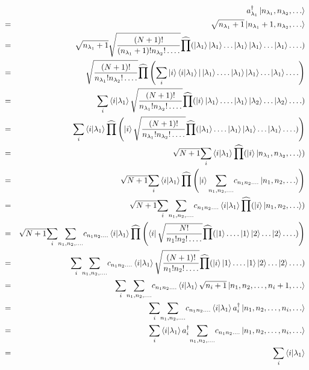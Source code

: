 \documentclass{article}
\begin{document}
\begin{eqnarray*}  
&  & a_{\lambda_1}^{\dag}  \ket{n_{\lambda_1}, n_{\lambda_2}, \ldots} \\ & = & \sqrt{n_{\lambda_1} + 1} \ket{n_{\lambda_1} + 1,  n_{\lambda_2}, \ldots}\\  & = & \sqrt{n_{\lambda_1} + 1} \sqrt{\frac{(N + 1) !}{(n_{\lambda_1} + 1)  !n_{\lambda_2} ! \ldots .}} \widehat{\prod} (\ket{\lambda_1}    \ket{\lambda_1} \ldots \ket{\lambda_1}  \ket{\lambda_1} \ldots  \ket{\lambda_1} \ldots .  )\\  & = & \sqrt{\frac{(N + 1) !}{n_{\lambda_1} !n_{\lambda_2} ! \ldots .}}  \widehat{\prod} \left( \underset{i}{\sum} \ket{i}\braket{i|\lambda_1} |  \ket{\lambda_1} \ldots . \ket{\lambda_1}  \ket{\lambda_1}  \ldots \ket{\lambda_1} \ldots .   \right)\\  & = & \underset{i}{\sum}  \braket{i|\lambda_1} \sqrt{\frac{(N + 1)  !}{n_{\lambda_1} !n_{\lambda_2} ! \ldots .}} \widehat{\prod} (\ket{i}   \ket{\lambda_1}  \ldots . \ket{\lambda_1}  \ket{\lambda_2} \ldots \ket{\lambda_2} \ldots .  )\\  & = & \underset{i}{\sum}  \braket{i|\lambda_1} \widehat{\prod}  \left( \ket{i}  \sqrt{\frac{(N + 1) !}{n_{\lambda_1} !n_{\lambda_2}  ! \ldots .}} \widehat{\prod} (\ket{\lambda_1}  \ldots . \ket{\lambda_1}  \ket{\lambda_1} \ldots \ket{\lambda_1} \ldots .   ) \right)\\  & = & \sqrt{N + 1} \underset{i}{\sum}  \braket{i|\lambda_1}  \widehat{\prod} (\ket{i}  \ket{n_{\lambda_1}, n_{\lambda_2},  \ldots })\\  & = & \sqrt{N + 1} \underset{i}{\sum}  \braket{i|\lambda_1}  \widehat{\prod} \left( \ket{i}  \underset{n_1, n_2, \ldots .}{\sum}  c_{n_1 n_2 \ldots .} \ket{n_1, n_2, \ldots} \right)\\  & = & \sqrt{N + 1} \underset{i}{\sum} \underset{n_1, n_2, \ldots .}{\sum}  c_{n_1 n_2 \ldots .}  \braket{i|\lambda_1} \widehat{\prod} (\ket{i} \ket{n_1, n_2, \ldots})\\  & = & \sqrt{N + 1} \underset{i}{\sum} \underset{n_1, n_2, \ldots .}{\sum}  c_{n_1 n_2 \ldots .}  \braket{i|\lambda_1} \widehat{\prod} \left( \bra{i}  \sqrt{\frac{N!}{n_1 !n_2 ! \ldots .}} \widehat{\prod} (\ket{1}   \ldots . \ket{1}  \ket{2} \ldots \ket{2} \ldots .   ) \right)\\  & = & \underset{i}{\sum} \underset{n_1, n_2, \ldots .}{\sum} c_{n_1 n_2  \ldots .}  \braket{i|\lambda_1} \sqrt{\frac{(N + 1) !}{n_1 !n_2 !  \ldots .}} \widehat{\prod} (\ket{i}  \ket{1}  \ldots . \ket{1}   \ket{2} \ldots \ket{2} \ldots .  )\\  & = & \underset{i}{\sum} \underset{n_1, n_2, \ldots .}{\sum} c_{n_1 n_2  \ldots .}  \braket{i|\lambda_1} \sqrt{n_i + 1} \ket{n_1, n_2,  \ldots, n_i + 1, \ldots}\\  & = & \underset{i}{\sum} \underset{n_1, n_2, \ldots .}{\sum} c_{n_1 n_2  \ldots .}  \braket{i|\lambda_1} a_i^{\dag} \ket{n_1, n_2,  \ldots, n_i, \ldots}\\  & = & \underset{i}{\sum}  \braket{i|\lambda_1} a_i^{\dag}  \underset{n_1, n_2, \ldots .}{\sum} c_{n_1 n_2 \ldots .} \ket{n_1,  n_2, \ldots, n_i, \ldots}\\  & = & \underset{i}{\sum}  \braket{i|\lambda_1} 
\end{eqnarray*}
\end{document}
